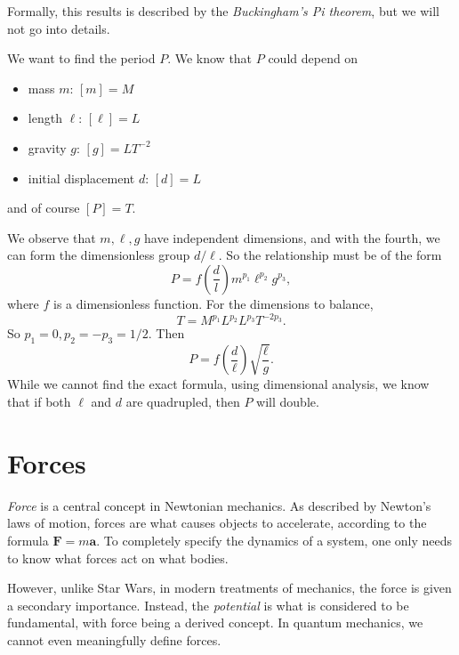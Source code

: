 \documentclass[a4paper]{article}
\begin{document}
Formally, this results is described by the \emph{Buckingham's Pi theorem}, but we will not go into details.

\begin{eg}\leavevmode
  \begin{center}
  \end{center}
  We want to find the period $P$. We know that $P$ could depend on
  \begin{itemize}
    \item mass $m$: $[m] = M$
    \item length $\ell$: $[\ell] = L$
    \item gravity $g$: $[g] = LT^{-2}$
    \item initial displacement $d$: $[d] = L$
  \end{itemize}
  and of course $[P] = T$.

  We observe that $m, \ell, g$ have independent dimensions, and with the fourth, we can form the dimensionless group $d/\ell$. So the relationship must be of the form
  \[
    P = f\left(\frac{d}{l}\right) m^{p_1}\ell^{p_2}g^{p_3},
  \]
  where $f$ is a dimensionless function. For the dimensions to balance,
  \[
    T = M^{p_1}L^{p_2}L^{p_3}T^{-2p_3}.
  \]
  So $p_1 = 0, p_2 = -p_3 = 1/2$. Then
  \[
    P = f\left(\frac{d}{\ell}\right) \sqrt{\frac{\ell}{g}}.
  \]
  While we cannot find the exact formula, using dimensional analysis, we know that if both $\ell$ and $d$ are quadrupled, then $P$ will double.
\end{eg}

\section{Forces}
\emph{Force} is a central concept in Newtonian mechanics. As described by Newton's laws of motion, forces are what causes objects to accelerate, according to the formula $\mathbf{F} = m\mathbf{a}$. To completely specify the dynamics of a system, one only needs to know what forces act on what bodies.

However, unlike Star Wars, in modern treatments of mechanics, the force is given a secondary importance. Instead, the \emph{potential} is what is considered to be fundamental, with force being a derived concept. In quantum mechanics, we cannot even meaningfully define forces.
\end{document}
